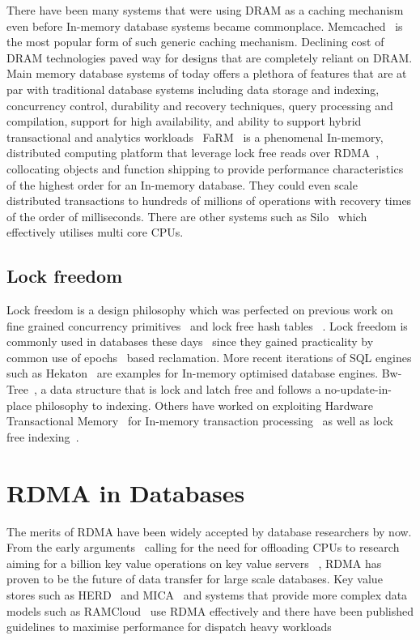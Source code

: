 There have been many systems that were using DRAM as a caching mechanism even before
In-memory database systems became commonplace. Memcached~\cite{memcached-orig} is 
the most popular form of such generic caching mechanism. Declining cost of DRAM 
technologies paved way for designs that are completely reliant on DRAM. Main memory
database systems of today offers a plethora of features that are at par with traditional
database systems including data storage and indexing, concurrency control, durability and 
recovery techniques, query processing and compilation, support for high availability, and 
ability to support hybrid transactional and analytics workloads~\cite{mmdbmstutorial}
FaRM~\cite{farm} is a phenomenal In-memory, distributed computing platform that leverage lock free reads over RDMA~\cite{rdma},
collocating objects and function shipping to provide performance characteristics of the 
highest order for an In-memory database. They could even scale distributed transactions to
hundreds of millions of operations with recovery times of the order of milliseconds. There 
are other systems such as Silo~\cite{silo} which effectively utilises multi core CPUs.

\subsection{Lock freedom}
Lock freedom is a design philosophy which was perfected on previous work on fine grained concurrency 
primitives~\cite{finegrained} and lock free hash tables ~\cite{lockfreeht}. Lock freedom is commonly
used in databases these days~\cite{htm} since they gained practicality by common use of
epochs~\cite{lockfreedom} based reclamation. 
More recent iterations of SQL engines such as Hekaton~\cite{hekaton} are 
examples for In-memory optimised  database engines. Bw-Tree~\cite{bw-tree}, a 
data structure that is lock and latch free and follows a no-update-in-place philosophy to indexing.
Others have worked on exploiting Hardware Transactional Memory~\cite{htm-old}
for In-memory transaction processing~\cite{drtm} as well as lock free indexing~\cite{htm}.

\section{RDMA in Databases}
The merits of RDMA have been widely accepted by database researchers by now. From
the early arguments~\cite{rdmacase} calling for the need for offloading CPUs to 
research aiming for a billion key value operations on key value servers ~\cite{rdmabillion},
RDMA has proven to be the future of data transfer for large scale databases. Key value stores
such as HERD~\cite{herd} and MICA~\cite{mica} and systems that provide more complex
data models such as RAMCloud~\cite{ramcloud} use RDMA effectively and there have been 
published guidelines to maximise performance for dispatch heavy workloads~\cite{rdma}

